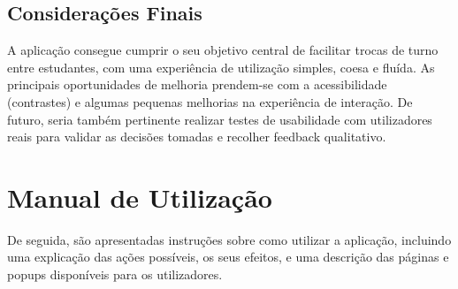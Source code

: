 \documentclass{article}
\begin{document}
\subsection{Considerações Finais}

A aplicação consegue cumprir o seu objetivo central de facilitar trocas de turno entre estudantes, com uma experiência de utilização simples, coesa e fluída. As principais oportunidades de melhoria prendem-se com a acessibilidade (contrastes) e algumas pequenas melhorias na experiência de interação. De futuro, seria também pertinente realizar testes de usabilidade com utilizadores reais para validar as decisões tomadas e recolher feedback qualitativo.

\newpage
\section{Manual de Utilização}
De seguida, são apresentadas instruções sobre como utilizar a aplicação, incluindo uma explicação das ações possíveis, os seus efeitos, e uma descrição das páginas e popups disponíveis para os utilizadores.
\end{document}
